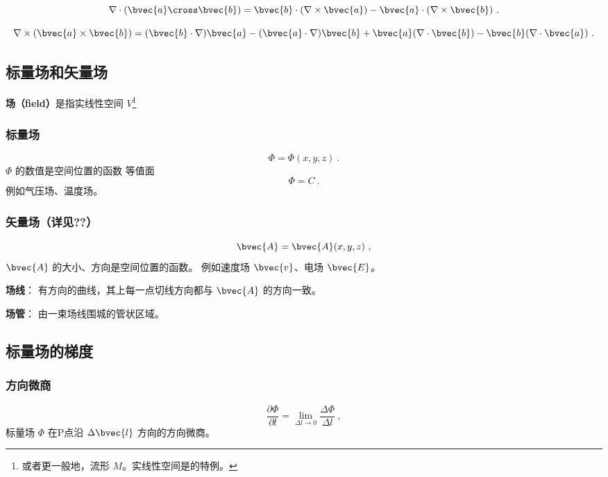 \begin{equation}
\nabla\cdot(\bvec{a}\cross\bvec{b})=\bvec{b}\cdot(\nabla\times\bvec{a})-\bvec{a}\cdot(\nabla\times\bvec{b})~.
\end{equation}

\begin{equation}
\nabla\times(\bvec{a}\times\bvec{b})=(\bvec{b}\cdot\nabla)\bvec{a}-(\bvec{a}\cdot\nabla)\bvec{b}+\bvec{a}(\nabla\cdot\bvec{b})-\bvec{b}(\nabla\cdot\bvec{a})~.
\end{equation}



\subsection{标量场和矢量场}

\textbf{场（field）}是指实线性空间 $V$\footnote{或者更一般地，流形 $M$。实线性空间是的特例。}

\subsubsection{标量场}
\begin{equation}\label{eq_VecAnl_1}
\Phi=\Phi(x,y,z)~.
\end{equation}
 $\Phi$ 的数值是空间位置的函数
 等值面
\begin{equation}\label{eq_VecAnl_2}
\Phi=C~.
\end{equation}
 例如气压场、温度场。
\subsubsection{矢量场（详见??）}%
\begin{equation}\label{eq_VecAnl_3}
\bvec {A}= \bvec{A}(x,y,z)~,
\end{equation}
$\bvec{A}$ 的大小、方向是空间位置的函数。
例如速度场 $\bvec{v}$、电场 $\bvec{E}$。

\textbf{场线}： 有方向的曲线，其上每一点切线方向都与 $\bvec{A}$ 的方向一致。

\textbf{场管}： 由一束场线围城的管状区域。

\subsection{标量场的梯度}%
\subsubsection{方向微商}
\begin{equation}\label{eq_VecAnl_4}
\frac{\partial \Phi}{\partial l}=\lim_{\Delta l \to 0}\frac{\Delta \Phi}{\Delta l}~,
\end{equation}
标量场 $\Phi$ 在P点沿 $\Delta \bvec{l} $ 方向的方向微商。

